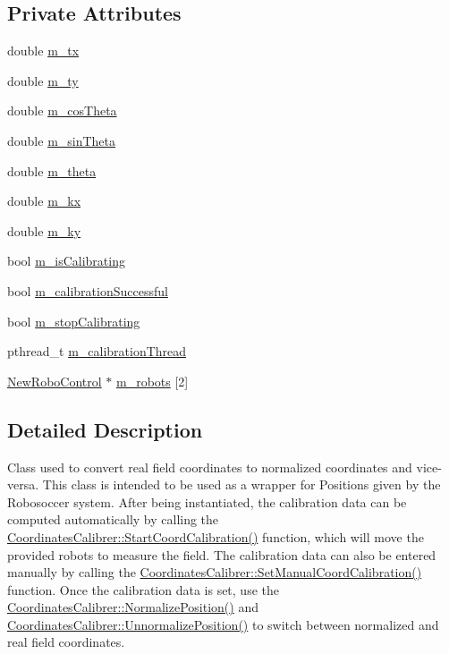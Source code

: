 \subsection*{Private Attributes}
\begin{DoxyCompactItemize}
\item 
double \hyperlink{classCoordinatesCalibrer_ad3dcf12acb15253d8467440ccf917581}{m\_\-tx}
\item 
double \hyperlink{classCoordinatesCalibrer_a7e9c56017cf2f279564f2aba38aa146b}{m\_\-ty}
\item 
double \hyperlink{classCoordinatesCalibrer_a0fd71c87e90fc61802942e22c9584fb9}{m\_\-cosTheta}
\item 
double \hyperlink{classCoordinatesCalibrer_af2675b7f9f8612eb53e81a5268501180}{m\_\-sinTheta}
\item 
double \hyperlink{classCoordinatesCalibrer_a039975d1cf826afcb960e77f8f957f91}{m\_\-theta}
\item 
double \hyperlink{classCoordinatesCalibrer_a337af708f5dc1bfca0d191b988d8ab49}{m\_\-kx}
\item 
double \hyperlink{classCoordinatesCalibrer_a10648b2ef70a9ad0fd874e04f3b4d488}{m\_\-ky}
\item 
bool \hyperlink{classCoordinatesCalibrer_a2d3543afab02c87d0e06861d064bd265}{m\_\-isCalibrating}
\item 
bool \hyperlink{classCoordinatesCalibrer_aade3d6c933ebb71c197061828ca6b951}{m\_\-calibrationSuccessful}
\item 
bool \hyperlink{classCoordinatesCalibrer_ac8da80d736936d73e78f21a7f046855d}{m\_\-stopCalibrating}
\item 
pthread\_\-t \hyperlink{classCoordinatesCalibrer_aa2b792c4284dc94338c9acbd26ea2c3a}{m\_\-calibrationThread}
\item 
\hyperlink{classNewRoboControl}{NewRoboControl} $\ast$ \hyperlink{classCoordinatesCalibrer_aebcdb5e598d2af268ab93a0271c245b6}{m\_\-robots} \mbox{[}2\mbox{]}
\end{DoxyCompactItemize}


\subsection{Detailed Description}
Class used to convert real field coordinates to normalized coordinates and vice-\/versa. This class is intended to be used as a wrapper for Positions given by the Robosoccer system. After being instantiated, the calibration data can be computed automatically by calling the \hyperlink{classCoordinatesCalibrer_a2087994adbb8651efcb06e3d7a2315da}{CoordinatesCalibrer::StartCoordCalibration()} function, which will move the provided robots to measure the field. The calibration data can also be entered manually by calling the \hyperlink{classCoordinatesCalibrer_a006c18905b14e4780b9fc74fe26649fc}{CoordinatesCalibrer::SetManualCoordCalibration()} function. Once the calibration data is set, use the \hyperlink{classCoordinatesCalibrer_ad6519b69842756c256922d14d1e248ce}{CoordinatesCalibrer::NormalizePosition()} and \hyperlink{classCoordinatesCalibrer_a8522193b13196313d001c589e7845bd3}{CoordinatesCalibrer::UnnormalizePosition()} to switch between normalized and real field coordinates. 

